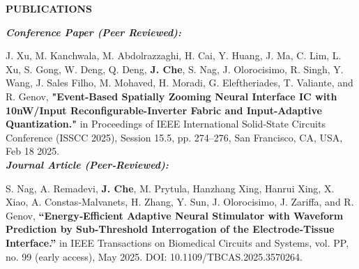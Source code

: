 \documentclass[11pt]{article}
\begin{document}
\vspace{0.05in}



\vspace{0.15in}


{\noindent \bfseries PUBLICATIONS}
\vspace{0.05in}
\hline

\vspace{0.1in}

\noindent
{\sl \bfseries Conference Paper (Peer Reviewed):}

\noindent
J. Xu, M. Kanchwala, M. Abdolrazzaghi, H. Cai, Y. Huang, J. Ma, C. Lim, L. Xu, S. Gong, W. Deng, Q. Deng, \textbf{J. Che}, S. Nag, J. Olorocisimo, R. Singh, Y. Wang, J. Sales Filho, M. Mohaved, H. Moradi, G. Eleftheriades, T. Valiante, and R. Genov, \textbf{"Event-Based Spatially Zooming Neural Interface IC with 10nW/Input Reconfigurable-Inverter Fabric and Input-Adaptive Quantization."} in Proceedings of IEEE International Solid‑State Circuits Conference (ISSCC 2025), Session 15.5, pp. 274–276, San Francisco, CA, USA, Feb 18 2025. \\

\noindent
{\sl \bfseries Journal Article (Peer‑Reviewed):}

\noindent
S. Nag, A. Remadevi, \textbf{J. Che}, M. Prytula, Hanzhang Xing, Hanrui Xing, X. Xiao, A. Constas‑Malvanets, H. Zhang, Y. Sun, J. Olorocisimo, J. Zariffa, and R. Genov, \textbf{“Energy‑Efficient Adaptive Neural Stimulator with Waveform Prediction by Sub‑Threshold Interrogation of the Electrode‑Tissue Interface.”} in IEEE Transactions on Biomedical Circuits and Systems, vol. PP, no. 99 (early access), May 2025. DOI: 10.1109/TBCAS.2025.3570264. \\
\end{document}
